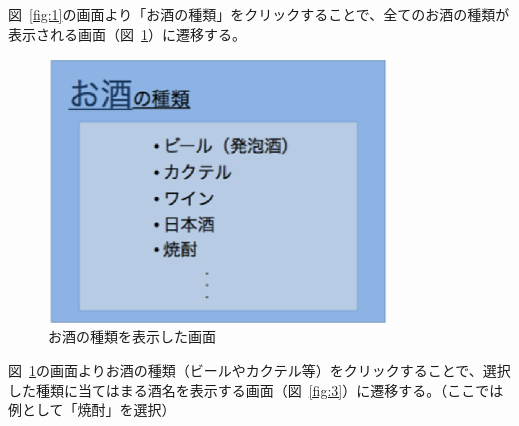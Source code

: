 \documentclass[a4j,titlepage]{jarticle}
\begin{document}
図~\ref{fig:1}の画面より「お酒の種類」をクリックすることで、全てのお酒の種類が表示される画面（図~\ref{fig:2}）に遷移する。
\clearpage
\begin {figure}[!htbp]
    \begin{center}
    \includegraphics [height=7cm, width=9cm]{2.eps}
    \caption {お酒の種類を表示した画面}
    \label {fig:2}
    \end{center}
\end {figure}


図~\ref{fig:2}の画面よりお酒の種類（ビールやカクテル等）をクリックすることで、選択した種類に当てはまる酒名を表示する画面（図~\ref{fig:3}）に遷移する。（ここでは例として「焼酎」を選択）
\end{document}
